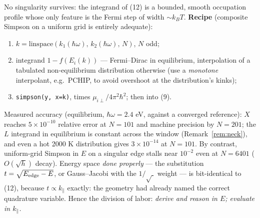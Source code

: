 \documentclass[11pt,a4paper]{article}
\numberwithin{equation}{section}
\begin{document}
No singularity survives: the integrand of (12) is a bounded, smooth
occupation profile whose only feature is the Fermi step of width
$\sim{k_B} T$.  \textbf{Recipe} (composite Simpson on a uniform grid is
entirely adequate):
\begin{enumerate}
\item $k=\mathrm{linspace}(k_1({\hbar\omega}),\,k_2({\hbar\omega}),\,N)$, $N$ odd;
\item integrand $1-{f}(E_i(k))$ --- Fermi--Dirac in equilibrium, interpolation of a tabulated non-equilibrium distribution otherwise (use a \emph{monotone} interpolant, e.g.\ PCHIP, to avoid overshoot at the distribution's kinks);
\item \texttt{simpson(y, x=k)}, times $\mu_{i\perp}/4\pi^2\hbar^2$; then into (9).
\end{enumerate}
Measured accuracy (equilibrium, ${\hbar\omega}=2.4$ eV, against a converged
reference): $X$ reaches $5\times10^{-10}$ relative error at $N=101$
and machine precision by $N=201$; the $L$ integrand in equilibrium is
constant across the window (Remark~\ref{rem:neck}), and even a hot
2000 K distribution gives $3\times10^{-14}$ at $N=101$.  By contrast,
uniform-grid Simpson in $E$ on a singular edge stalls near $10^{-2}$
even at $N=6401$ ($O(\sqrt h)$ decay).  Energy space \emph{done
properly} --- the substitution $t=\sqrt{E_{\rm edge}-E}$, or
Gauss--Jacobi with the $1/\sqrt{\;}$ weight --- is bit-identical to
(12), because $t\propto{k_{\parallel}}$ exactly: the geometry had already named
the correct quadrature variable.  Hence the division of labor:
\emph{derive and reason in $E$; evaluate in ${k_{\parallel}}$.}
\end{document}
